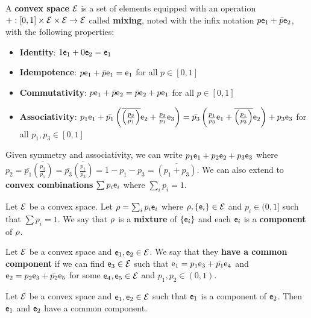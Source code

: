 \begin{defn}
	A \textbf{convex space} $\Ens$ is a set of elements equipped with an operation $+ : [0, 1] \times \Ens \times \Ens \to \Ens$ called \textbf{mixing}, noted with the infix notation $p \ens_1 + \bar{p} \ens_2$, with the following properties:
	\begin{itemize}
		\item \textbf{Identity}: $1 \ens_1 + 0 \ens_2 = \ens_1$
		\item \textbf{Idempotence}:  $p \ens_1 + \bar{p} \ens_1 = \ens_1$ for all $p \in [0,1]$
		\item \textbf{Commutativity}: $p \ens_1 + \bar{p} \ens_2 = \bar{p} \ens_2 + p \ens_1$ for all $p \in [0,1]$
		\item \textbf{Associativity}: $p_1 \ens_1 + \bar{p_1}\left(\overline{\left(\frac{p_3}{\bar{p_1}}\right)}\ens_2 + \frac{p_3}{\bar{p_1}}\ens_3\right) =  \bar{p_3}\left(\frac{p_1}{\bar{p_3}} \ens_1 +  \overline{\left(\frac{p_1}{\bar{p_3}}\right)}\ens_2\right) + p_3 \ens_3$ for all $p_1, p_3 \in [0,1]$
	\end{itemize}
	Given symmetry and associativity, we can write $p_1 \ens_1 + p_2 \ens_2 + p_3 \ens_3$ where $p_2 = \bar{p_1}\overline{\left(\frac{p_3}{\bar{p_1}}\right)} = \bar{p_3}\overline{\left(\frac{p_1}{\bar{p_3}}\right)} = 1 - p_1 - p_3 = \overline{\left(p_1 + p_3\right)}$. We can also extend to \textbf{convex combinations} $\sum p_i \ens_i$ where $\sum_i p_i = 1$.
\end{defn}


\begin{defn}
	Let $\Ens$ be a convex space. Let $\ens[\rho] = \sum_i p_i \ens_i$ where $\ens[\rho], \{\ens_i\} \in \Ens$ and $p_i \in (0,1]$ such that $\sum p_i = 1$. We say that $\ens[\rho]$ is a \textbf{mixture} of $\{\ens_i\}$ and each $\ens_i$ is a \textbf{component} of $\ens[\rho]$.
\end{defn}

\begin{defn}
	Let $\Ens$ be a convex space and $\ens_1, \ens_2 \in \Ens$. We say that they \textbf{have a common component} if we can find $\ens_3 \in \Ens$ such that $\ens_1 = p_1 \ens_3 + \bar{p_1} \ens_4$ and $\ens_2 = p_2 \ens_3 + \bar{p_2} \ens_5$ for some $\ens_4, \ens_5 \in \Ens$ and $p_1, p_2 \in (0,1)$.
\end{defn}

\begin{coro}
	Let $\Ens$ be a convex space and $\ens_1, \ens_2 \in \Ens$ such that $\ens_1$ is a component of $\ens_2$. Then $\ens_1$ and $\ens_2$ have a common component.
\end{coro}


